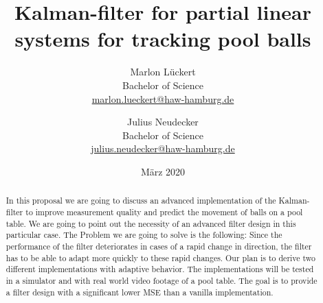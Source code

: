 \documentclass[titlepage, a4paper, 11pt]{scrartcl}
\begin{document}
\title{Kalman-filter for partial linear systems for tracking pool balls}
\author{Marlon Lückert \\ Bachelor of Science \\ \href{mailto:marlon.lueckert@haw-hamburg.de}{marlon.lueckert@haw-hamburg.de} 
   \and Julius Neudecker \\ Bachelor of Science \\ \href{mailto:julius.neudecker@haw-hamburg.de}{julius.neudecker@haw-hamburg.de} }
\date{März 2020}
\maketitle

\tableofcontents

\begin{abstract}
    In this proposal we are going to discuss an advanced implementation of the Kalman-filter \cite{kalman} to improve measurement quality and predict the movement of balls on a pool table. 
    We are going to point out the necessity of an advanced filter design in this particular case. The Problem we are going to solve is the following:
    Since the performance of the filter deteriorates in cases of a rapid change in direction, the filter has to be able to adapt more quickly to these rapid changes.
    Our plan is to derive two different implementations with adaptive behavior. The implementations will be tested in a simulator and with real world video footage of a pool table.
    The goal is to provide a filter design with a significant lower MSE than a vanilla implementation.
\end{abstract}
\end{document}

